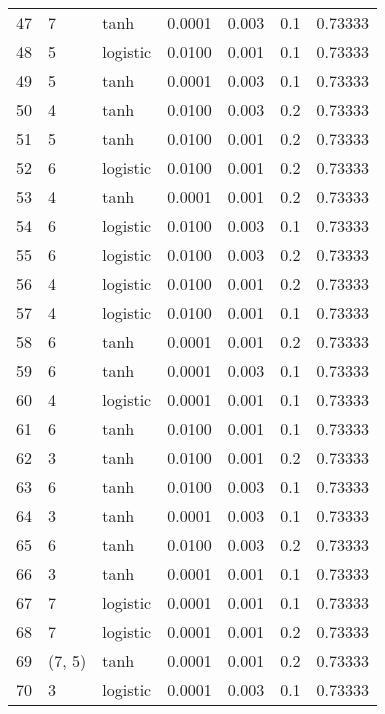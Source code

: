 \begin{tabular}{lllrrrr}
47  &           7 &      tanh &  0.0001 &  0.003 &  0.1 &   0.73333 \\
48  &           5 &  logistic &  0.0100 &  0.001 &  0.1 &   0.73333 \\
49  &           5 &      tanh &  0.0001 &  0.003 &  0.1 &   0.73333 \\
50  &           4 &      tanh &  0.0100 &  0.003 &  0.2 &   0.73333 \\
51  &           5 &      tanh &  0.0100 &  0.001 &  0.2 &   0.73333 \\
52  &           6 &  logistic &  0.0100 &  0.001 &  0.2 &   0.73333 \\
53  &           4 &      tanh &  0.0001 &  0.001 &  0.2 &   0.73333 \\
54  &           6 &  logistic &  0.0100 &  0.003 &  0.1 &   0.73333 \\
55  &           6 &  logistic &  0.0100 &  0.003 &  0.2 &   0.73333 \\
56  &           4 &  logistic &  0.0100 &  0.001 &  0.2 &   0.73333 \\
57  &           4 &  logistic &  0.0100 &  0.001 &  0.1 &   0.73333 \\
58  &           6 &      tanh &  0.0001 &  0.001 &  0.2 &   0.73333 \\
59  &           6 &      tanh &  0.0001 &  0.003 &  0.1 &   0.73333 \\
60  &           4 &  logistic &  0.0001 &  0.001 &  0.1 &   0.73333 \\
61  &           6 &      tanh &  0.0100 &  0.001 &  0.1 &   0.73333 \\
62  &           3 &      tanh &  0.0100 &  0.001 &  0.2 &   0.73333 \\
63  &           6 &      tanh &  0.0100 &  0.003 &  0.1 &   0.73333 \\
64  &           3 &      tanh &  0.0001 &  0.003 &  0.1 &   0.73333 \\
65  &           6 &      tanh &  0.0100 &  0.003 &  0.2 &   0.73333 \\
66  &           3 &      tanh &  0.0001 &  0.001 &  0.1 &   0.73333 \\
67  &           7 &  logistic &  0.0001 &  0.001 &  0.1 &   0.73333 \\
68  &           7 &  logistic &  0.0001 &  0.001 &  0.2 &   0.73333 \\
69  &      (7, 5) &      tanh &  0.0001 &  0.001 &  0.2 &   0.73333 \\
70  &           3 &  logistic &  0.0001 &  0.003 &  0.1 &   0.73333 \\

\end{tabular}
